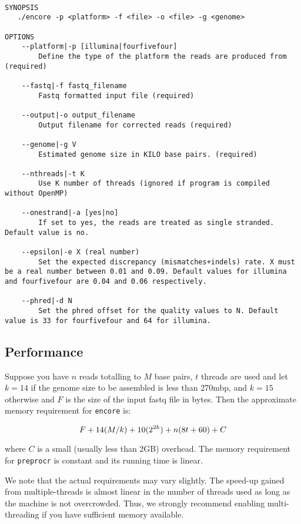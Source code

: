 \documentclass[12pt,a4paper]{report}
\begin{document}
\begin{lstlisting}

SYNOPSIS
   ./encore -p <platform> -f <file> -o <file> -g <genome> 

OPTIONS 
    --platform|-p [illumina|fourfivefour] 
        Define the type of the platform the reads are produced from (required) 

    --fastq|-f fastq_filename 
        Fastq formatted input file (required) 

    --output|-o output_filename 
        Output filename for corrected reads (required) 

    --genome|-g V 
        Estimated genome size in KILO base pairs. (required) 

    --nthreads|-t K 
        Use K number of threads (ignored if program is compiled without OpenMP) 

    --onestrand|-a [yes|no] 
        If set to yes, the reads are treated as single stranded. Default value is no. 

    --epsilon|-e X (real number) 
        Set the expected discrepancy (mismatches+indels) rate. X must be a real number between 0.01 and 0.09. Default values for illumina and fourfivefour are 0.04 and 0.06 respectively. 

    --phred|-d N 
        Set the phred offset for the quality values to N. Default value is 33 for fourfivefour and 64 for illumina. 

\end{lstlisting}

\subsection{Performance}

Suppose you have $n$ reads totalling to $M$ base pairs, $t$ threads are used and let $k=14$ if the genome size to be assembled is less than 270mbp, and $k=15$ otherwise and $F$ is the size of the input fastq file in bytes. Then the approximate memory requirement for \texttt{encore} is:

\begin{equation}
F + 14(M/k) + 10(2^{2k}) + n(8t + 60) + C \\
\end{equation}

where $C$ is a small (usually less than 2GB) overhead. The memory requirement for \texttt{preprocr} is constant and its running time is linear.

We note that the actual requirements may vary slightly. The speed-up gained from multiple-threads is almost linear in the number of threads used as long as the machine is not overcrowded. Thus, we strongly recommend enabling multi-threading if you have sufficient memory available. 
\end{document}
